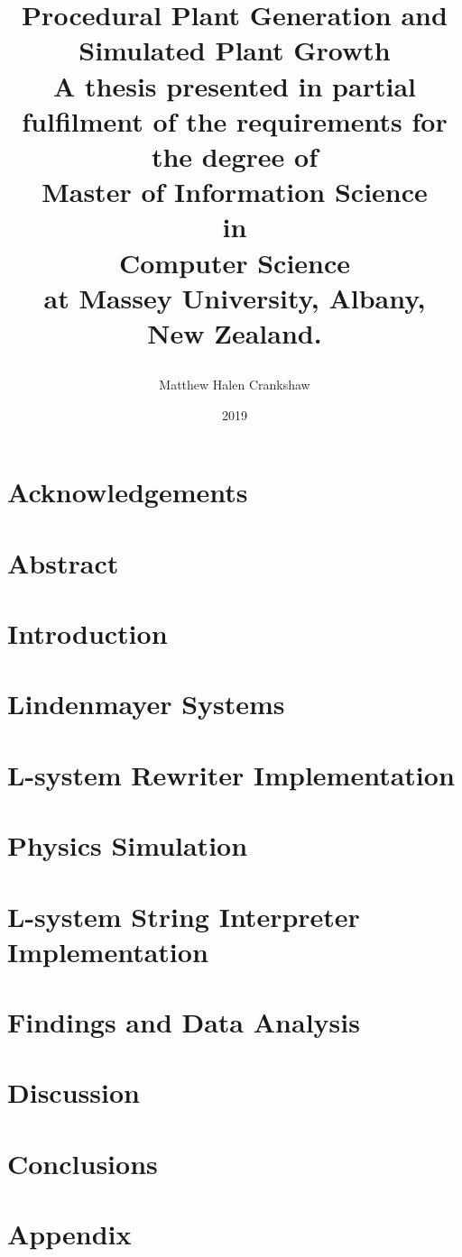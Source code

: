 \documentclass[11pt, twoside]{report}
\title{
{\huge Procedural Plant Generation and Simulated Plant Growth }\\
\vspace{3cm}
{\large A thesis presented in partial fulfilment of the requirements for the degree of \\
\vspace{4cm}
\large Master of Information Science\\
\large in\\
\large Computer Science\\
\vspace{4cm}
\large at Massey University, Albany, \\
\large New Zealand. }
\vspace{3cm}
\author{Matthew Halen Crankshaw}
\date{2019}
}
\begin{document}
\maketitle

\chapter*{Acknowledgements}

\chapter*{Abstract}

\tableofcontents
\listoffigures
\listoftables


\chapter{Introduction}


\chapter{Lindenmayer Systems}  \label{l-system chapter} 


\chapter{L-system Rewriter Implementation}


\chapter{Physics Simulation}


\chapter{L-system String Interpreter Implementation} \label{interpreter implementation}


\chapter{Findings and Data Analysis}


\chapter{Discussion}


\chapter{Conclusions}


\printglossary[type=\acronymtype]
\printglossary

\appendix
\chapter{Appendix}

\end{document}
